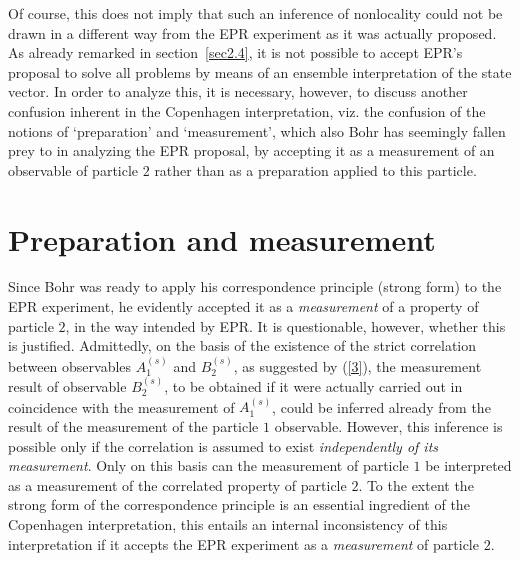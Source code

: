 \documentclass[12pt]{article}
\begin{document}
Of course, this does not imply that such an inference of
nonlocality could not be drawn in a different way from the EPR
experiment as it was actually proposed. As already remarked in
section~\ref{sec2.4}, it is not possible to accept EPR's proposal
to solve all problems by means of an ensemble interpretation of
the state vector. In order to analyze this, it is necessary,
however, to discuss another confusion inherent in the Copenhagen
interpretation, viz. the confusion of the notions of `preparation'
and `measurement', which also Bohr has seemingly fallen prey to in
analyzing the EPR proposal, by accepting it as a measurement of an
observable of particle $2$ rather than as a preparation applied to
this particle.

\section{Preparation and measurement} \label{sec2.7}
Since Bohr was ready to apply his correspondence principle (strong
form) to the EPR experiment, he evidently accepted it as a {\em
measurement} of a property of particle $2$, in the way intended by
EPR. It is questionable, however, whether this is justified.
Admittedly, on the basis of the existence of the strict
correlation between observables $A_1^{(s)} $ and $B_2^{(s)} $, as
suggested by (\ref{3}), the measurement result of observable
$B_2^{(s)} $, to be obtained if it were actually carried out in
coincidence with the measurement of $A_1^{(s)} $, could be
inferred already from the result of the measurement of the
particle $1$ observable. However, this inference is possible only
if the correlation is assumed to exist {\em independently of its
measurement}. Only on this basis can the measurement of particle
$1$ be interpreted as a measurement of the correlated property of
particle $2$. To the extent the strong form of the correspondence
principle is an essential ingredient of the Copenhagen
interpretation, this entails an internal inconsistency of this
interpretation if it accepts the EPR experiment as a {\em
measurement} of particle $2$.
\end{document}
